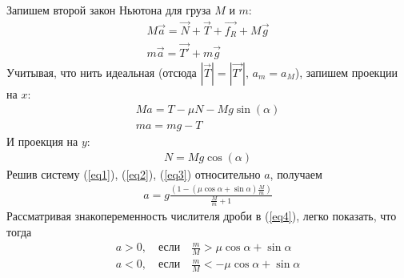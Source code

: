 \documentclass[a5paper,10pt]{article}
\begin{document}
\def\N{\vec{N}}
\def\T{\vec{T}}
\def\t{\vec{T'}}
\def\F{\vec{f_R}}
\def\P{M\vec{g}}
\def\p{m\vec{g}}

Запишем второй закон Ньютона для груза $M$ и $m$: 
\begin{gather}
	M\vec{a}=\N+\T+\F+\P\\
	m\vec{a}=\t+\p
\end{gather}
Учитывая, что нить идеальная  (отсюда $|\T|=|\t|$, $a_m=a_M$), запишем проекции на $x$: 
\begin{gather}
	\label{eq1}Ma=T-\mu{N}-Mg\sin(\alpha)\\
	\label{eq2}ma=mg-T
\end{gather}
И проекция на $y$:
\begin{gather}
	\label{eq3}N=Mg\cos(\alpha)
\end{gather}
Решив систему (\ref{eq1}), (\ref{eq2}), (\ref{eq3}) относительно $a$, получаем
\begin{gather}
	\label{eq4}a=g\frac{(1-(\mu\cos{\alpha}+\sin{\alpha})\frac{M}{m})}{\frac{M}{m}+1}
\end{gather}
Рассматривая знакопеременность числителя дроби в (\ref{eq4}), легко показать, что тогда 
\begin{gather}
	a>0, \hspace{1em}\text{если}\hspace{1em} \frac{m}{M}>\mu\cos{\alpha}+\sin{\alpha}\\
	a<0, \hspace{1em}\text{если}\hspace{1em} \frac{m}{M}<-\mu\cos{\alpha}+\sin{\alpha}
\end{gather}
\end{document}
